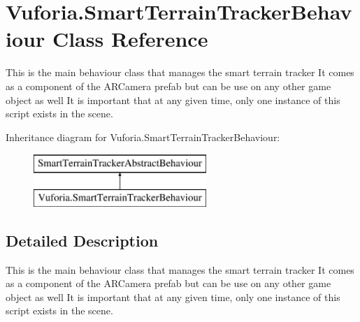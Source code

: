 \hypertarget{class_vuforia_1_1_smart_terrain_tracker_behaviour}{}\section{Vuforia.\+Smart\+Terrain\+Tracker\+Behaviour Class Reference}
\label{class_vuforia_1_1_smart_terrain_tracker_behaviour}


This is the main behaviour class that manages the smart terrain tracker It comes as a component of the A\+R\+Camera prefab but can be use on any other game object as well It is important that at any given time, only one instance of this script exists in the scene.  


Inheritance diagram for Vuforia.\+Smart\+Terrain\+Tracker\+Behaviour\+:\begin{figure}[H]
\begin{center}
\leavevmode
\includegraphics[height=2.000000cm]{class_vuforia_1_1_smart_terrain_tracker_behaviour}
\end{center}
\end{figure}


\subsection{Detailed Description}
This is the main behaviour class that manages the smart terrain tracker It comes as a component of the A\+R\+Camera prefab but can be use on any other game object as well It is important that at any given time, only one instance of this script exists in the scene. 

